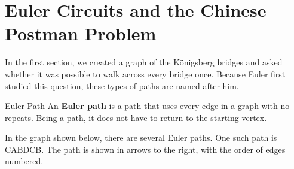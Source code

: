 \ifdefined \old

\section{Euler Circuits and the Chinese Postman Problem}
In the first section, we created a graph of the K\"onigsberg bridges and asked whether it was possible to walk across every bridge once.  Because Euler first studied this question, these types of paths are named after him.

\begin{definition}{Euler Path}
An \textbf{Euler path} is a path that uses every edge in a graph with no repeats.  Being a path, it does not have to return to the starting vertex.
\end{definition}

\begin{example}{}%
In the graph shown below, there are several Euler paths.  One such path is CABDCB.  The path is shown in arrows to the right, with the order of edges numbered.\\
\begin{minipage}{.5\textwidth}
\begin{center}
\end{center}
\end{minipage}
%
\begin{minipage}{.5\textwidth}
\begin{center}
\end{center}
\end{minipage}
\end{example}

